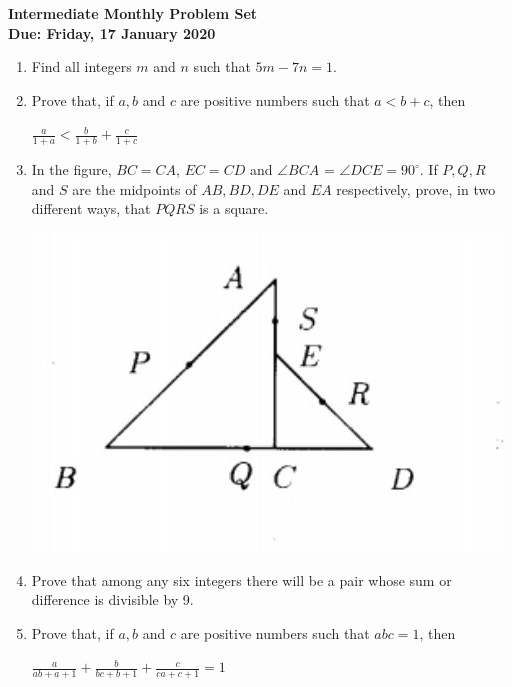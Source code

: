 \documentclass{article}
\begin{document}
\begin{center}
\textbf{\Large Intermediate Monthly Problem Set}
\\ \vspace{1em}
\textbf{\large Due: Friday, 17 January 2020}
\end{center}

\begin{enumerate}[1.]

\vspace{6pt}
\item %
Find all integers $m$ and $n$ such that $5m- 7n = 1$.

\vspace{6pt}
\item %
Prove that, if $a, b$ and $c$ are positive numbers such that $a < b + c$, then
\begin{center}
	$\frac{a}{1+a} < \frac{b}{1+b} + \frac{c}{1+c}$
\end{center}

\vspace{6pt}
\item
In the figure, $BC = CA$, $EC = CD$ and $\angle BCA$ = $\angle DCE = 90^{\circ}$. If $P, Q, R$ and $S$ are the
midpoints of $AB, BD, DE$ and
$EA$ respectively, prove, in two
different ways, that $PQRS$ is a
square.
\begin{center}
	\includegraphics[scale=0.5]{int_q5.jpg}
\end{center}


\item %
Prove that among any six integers there will be a pair whose sum
or difference is divisible by 9.

\vspace{6pt}
\item %
Prove that, if $a, b$ and $c$ are positive numbers such that $abc= 1$, then
\begin{center}
	$\frac{a}{ab + a + 1} + \frac{b}{bc + b + 1} + \frac{c}{ca + c + 1} = 1$
\end{center}


\end{enumerate}
\end{document}
